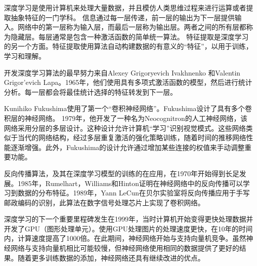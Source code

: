 深度学习是使用计算机来处理大量数据，并且模仿人类思维过程来进行运算或者提取抽象特征的一门学科。
信息通过每一层传递，前一层的输出为下一层提供输入。网络中的第一层称为输入层，而最后一层称为输出层。两者之间的所有层都称为隐藏层。每层通常是包含一种激活函数的简单统一算法。
特征提取是深度学习的另一个方面。特征提取使用算法自动构建数据的有意义的“特征”，以用于训练，学习和理解。


开发深度学习算法的最早努力来自Alexey Grigoryevich Ivakhnenko 和Valentin Grigor'evich Lapa。1965年，他们使用具有多项式激活函数的模型，然后进行统计分析。每一层都会将最佳统计选择的特征转发到下一层。

Kunihiko Fukushima使用了第一个“卷积神经网络”。Fukushima设计了具有多个卷积层的神经网络。 1979年，他开发了一种名为Neocognitron的人工神经网络，该网络采用分层的多层设计。这种设计允许计算机“学习”识别视觉模式。这些网络类似于当代的网络结构，经过多层重复激活的强化策略训练，随着时间的推移网络性能逐渐增强。此外，Fukushima的设计允许通过增加某些连接的权值来手动调整重要功能。

反向传播算法，及其在深度学习模型的训练的在应用，在1970年开始得到长足发展。1985年，Rumelhart，Williams和Hinton证明在神经网络中的反向传播可以学习到数据的分布特征。1989年，Yann LeCun在贝尔实验室将反向传播应用于手写邮政编码的识别，此算法在数字信号处理芯片上实现了卷积网络。

深度学习的下一个重要里程碑发生在1999年，当时计算机开始变得更快处理数据并开发了GPU（图形处理单元）。使用GPU处理图片的处理速度更快，在10年的时间内，计算速度提高了1000倍。在此期间，神经网络开始与支持向量机竞争。虽然神经网络与支持向量机相比可能较慢，但神经网络使用相同的数据提供了更好的结果。随着更多训练数据的添加，神经网络还具有继续改进的优点。


